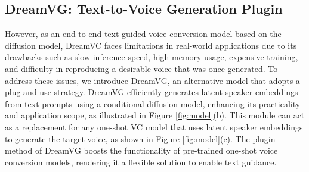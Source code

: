 \documentclass{Interspeech2024}
\begin{document}


\subsection{DreamVG: Text-to-Voice Generation Plugin}

However, as an end-to-end text-guided voice conversion model based on the diffusion model, DreamVC faces limitations in real-world applications due to its drawbacks such as slow inference speed, high memory usage, expensive training, and difficulty in reproducing a desirable voice that was once generated. To address these issues, we introduce DreamVG, an alternative model that adopts a plug-and-use strategy. DreamVG efficiently generates latent speaker embeddings from text prompts using a conditional diffusion model, enhancing its practicality and application scope, as illustrated in Figure \ref{fig:model}(b). This module can act as a replacement for any one-shot VC model that uses latent speaker embeddings to generate the target voice, as shown in Figure \ref{fig:model}(c). The plugin method of DreamVG boosts the functionality of pre-trained one-shot voice conversion models, rendering it a flexible solution to enable text guidance.

\end{document}
